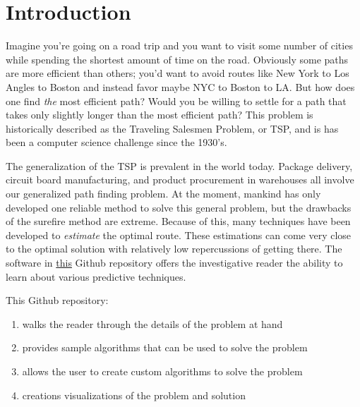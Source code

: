\documentclass[12pt]{article}
\begin{document}


\section{Introduction}

Imagine you're going on a road trip and you want to visit some number of cities while spending the shortest amount of time on the road.  Obviously some paths are more efficient than others; you'd want to avoid routes like New York to Los Angles to Boston and instead favor maybe NYC to Boston to LA.  But how does one find \textit{the} most efficient path?  Would you be willing to settle for a path that takes only slightly longer than the most efficient path?  This problem is historically described as the Traveling Salesmen Problem, or TSP, and is has been a computer science challenge since the 1930's.

The generalization of the TSP is prevalent in the world today. Package delivery, circuit board manufacturing, and product procurement in warehouses all involve our generalized path finding problem.  At the moment, mankind has only developed one reliable method to solve this general problem, but the drawbacks of the surefire method are extreme.  Because of this, many techniques have been developed to \textit{estimate} the optimal route.  These estimations can come very close to the optimal solution with relatively low repercussions of getting there.  The software in \href{https://github.com/astronomerhunter/pathfinding/tree/master}{this} Github repository offers the investigative reader the ability to learn about various predictive techniques.

This Github repository:
\begin{enumerate}
\item walks the reader through the details of the problem at hand
\item provides sample algorithms that can be used to solve the problem
\item allows the user to create custom algorithms to solve the problem
\item creations visualizations of the problem and solution
\end{enumerate}
\end{document}
